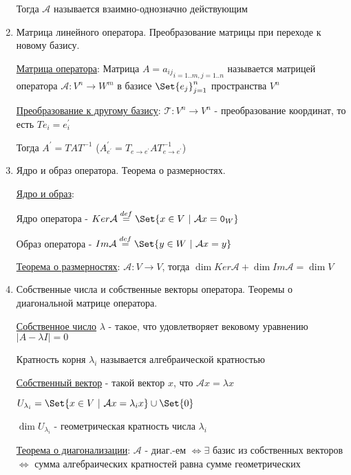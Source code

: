 \documentclass[12pt]{article}
\begin{document}
\begin{enumerate}
        Тогда $\mathcal{A}$ называется взаимно-однозначно действующим

        \item Матрица линейного оператора. Преобразование матрицы при переходе к новому базису.

        \hyperlink{operatorsmatrix}{Матрица оператора}: Матрица $A = {a_{ij}}_{i=1..m, j=1..n}$ называется матрицей оператора $\mathcal{A} : V^n \rightarrow W^m$ в базисе $\Set{e_j}^n_{j=1}$ пространства $V^n$

        \hyperlink{transformationtodifferentbasis}{Преобразование к другому базису}:     $\mathcal{T} : V^n \rightarrow V^n$ - преобразование координат, то есть $Te_i = e^\prime_i$

        Тогда $A^\prime = TAT^{-1}$ ($A^\prime_{e^\prime} = T_{e\to e^\prime}AT^{-1}_{e\to e^\prime}$)

        \item Ядро и образ оператора. Теорема о размерностях.

        \hyperlink{kernalandimageofoperator}{Ядро и образ}:

        Ядро оператора - $Ker \mathcal{A} \stackrel{def}{=} \Set{x \in V \ | \ \mathcal{A}x = \texttt{0}_W}$

        Образ оператора - $Im \mathcal{A} \stackrel{def}{=} \Set{y \in W \ | \ \mathcal{A}x = y}$

        \hyperlink{theoremaboutdimensions}{Теорема о размерностях}: $\mathcal{A} : V \rightarrow V$, тогда $\dim Ker \mathcal{A} + \dim Im \mathcal{A} = \dim V$


        \item Собственные числа и собственные векторы оператора. Теоремы о диагональной матрице оператора.

        \hyperlink{eigenvalue}{Собственное число} $\lambda$ - такое, что удовлетворяет вековому уравнению $|A - \lambda I| = 0$

        Кратность корня $\lambda_i$ называется алгебраической кратностью

        \hyperlink{eigenvector}{Собственный вектор} - такой вектор $x$, что $\mathcal{A}x = \lambda x$

        $U_{\lambda_i} = \Set{x \in V \ | \ \mathcal{A}x = \lambda_i x} \union \Set{0}$

        $\dim U_{\lambda_i}$ - геометрическая кратность числа $\lambda_i$

        \hyperlink{diagonalizedmatrixtheorem}{Теорема о диагонализации}: $\mathcal{A}$ - диаг.-ем $\Longleftrightarrow \exists$ базис из собственных векторов $\Longleftrightarrow$ сумма алгебраических кратностей равна сумме геометрических


\end{enumerate}
\end{document}
